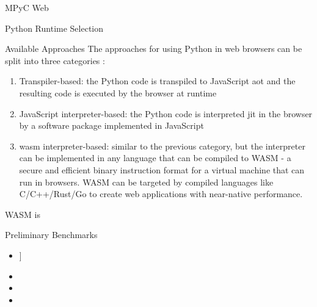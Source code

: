 \begin{block}{MPyC Web}
\begin{block}{Python Runtime Selection}
\begin{block}{Available Approaches}
\label{thesis__090-mpyc-web.md__available-approaches}
The approaches for using Python in web browsers can be split into three categories\autocite{pyodideIntroMozilla} \autocite{anvilPythonBrowser}:

\begin{enumerate}
\tightlist
\item
  Transpiler-based: the Python code is transpiled to JavaScript \gls{aot} and the resulting code is executed by the browser at runtime
\item
  JavaScript interpreter-based: the Python code is interpreted \gls{jit} in the browser by a software package implemented in JavaScript
\item
  \gls{wasm}\autocite{wasmDocs} interpreter-based: similar to the previous category, but the interpreter can be implemented in any language that can be compiled to WASM - a secure and efficient binary instruction format for a virtual machine that can run in browsers. WASM can be targeted by compiled languages like C/C++/Rust/Go to create web applications with near-native performance.
\end{enumerate}

WASM is
\end{block}

\begin{block}{Preliminary Benchmarks}
\label{thesis__090-mpyc-web.md__preliminary-benchmarks}
\end{block}

\begin{block}{}
\label{thesis__090-mpyc-web.md__section}
\begin{itemize}
\tightlist
\item
  {]}
\item
\item
\item
\end{itemize}


\end{block}
\end{block}
\end{block}
